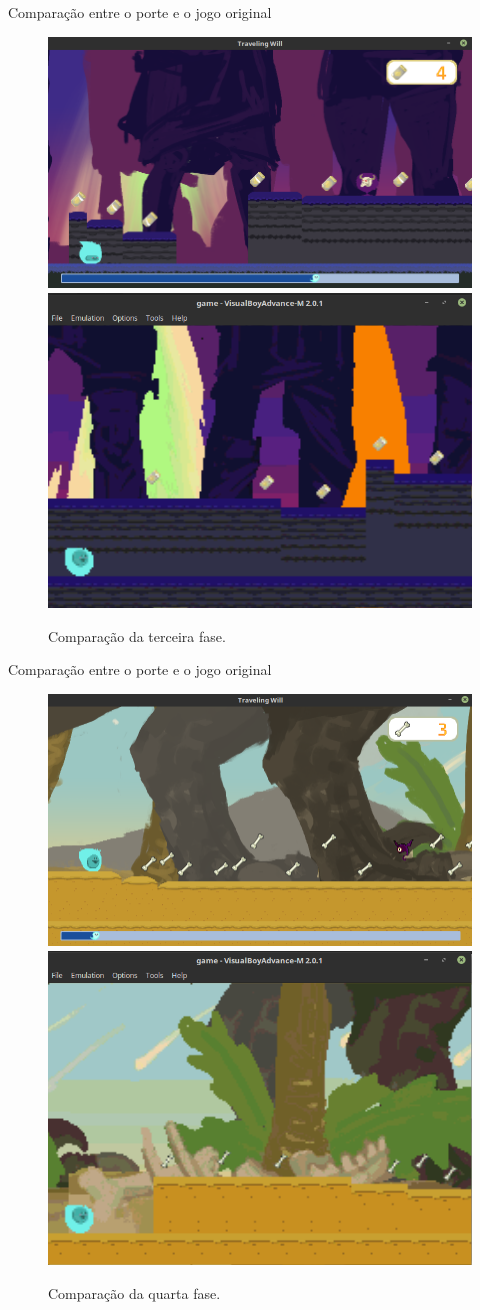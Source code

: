 \documentclass[notes, mathserif]{beamer}
\begin{document}
\begin{frame}{Compara\c c\~ao entre o porte e o jogo original}
	\begin{figure}%
    \includegraphics[width=.5\linewidth]{figuras/pc-fase3.png}
    \qquad
    \includegraphics[width=.4\linewidth]{figuras/gba-fase3.png}
    \caption{Compara\c c\~ao da terceira fase.}%
    \label{fig:comp1}%
	\end{figure}
\end{frame}

\begin{frame}{Compara\c c\~ao entre o porte e o jogo original}
	\begin{figure}%
    \includegraphics[width=.5\linewidth]{figuras/pc-fase4.png}
    \qquad
    \includegraphics[width=.4\linewidth]{figuras/gba-fase4.png}
    \caption{Compara\c c\~ao da quarta fase.}%
    \label{fig:comp1}%
	\end{figure}
\end{frame}
\end{document}
